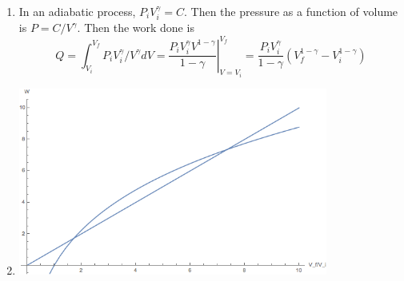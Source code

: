\documentclass[fleqn]{article}[12pt]
\begin{document}
\begin{enumerate}
\begin{enumerate}
        \item In an adiabatic process, $P_iV_i^\gamma = C$. Then the pressure as a function of volume is $P = C/V^\gamma$. Then the work done is
        \begin{equation*}
            Q = \int_{V_i}^{V_f} P_iV_i^\gamma/V^\gamma dV = \left.  \frac{P_iV_i^\gamma V^{1-\gamma}}{1-\gamma} \right|_{V=V_i}^{V_f} = \frac{P_iV_i^\gamma}{1-\gamma} (V_f^{1-\gamma}-V_i^{1-\gamma})
        \end{equation*}

        \item
        \includegraphics[width=0.8\textwidth]{graph3}
    \end{enumerate}
\end{enumerate}
\end{document}
